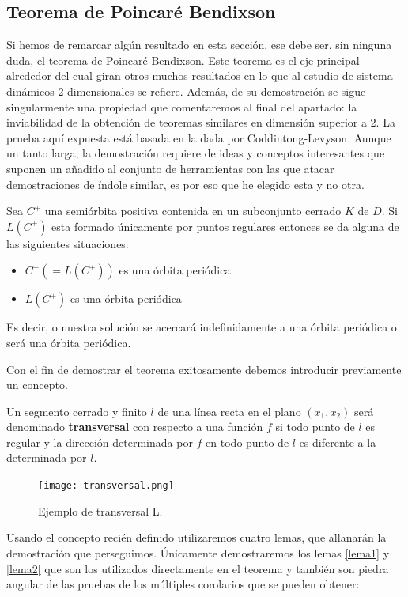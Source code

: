  \subsection{Teorema de Poincaré Bendixson}
 Si hemos de remarcar algún resultado en esta sección, ese debe ser, sin ninguna duda, el teorema de Poincaré Bendixson. Este teorema es el eje principal alrededor del cual giran otros muchos resultados en lo que al estudio de sistema dinámicos 2-dimensionales se refiere. Además, de su demostración se sigue singularmente una propiedad que comentaremos al final del apartado: la inviabilidad de la obtención de teoremas similares en dimensión superior a 2.
 La prueba aquí expuesta está basada en la dada por Coddintong-Levyson\cite{codin}. Aunque un tanto larga, la demostración requiere de ideas y conceptos interesantes que suponen un añadido al conjunto de herramientas con las que atacar demostraciones de índole similar, es por eso que he elegido esta y no otra.
 \begin{theorem}
 	\label{Poincare-Bendixson}
 	Sea $C^+$ una semiórbita positiva contenida en un subconjunto cerrado $K$ de $D$. Si $L(C^+)$ esta formado únicamente por puntos regulares entonces se da alguna de las siguientes situaciones:
 	\begin{itemize}
 		\item $C^+(=L(C^+))$ es una órbita periódica
 		\item $L(C^+)$ es una órbita periódica
 	\end{itemize}
 	Es decir, o nuestra solución se acercará indefinidamente a una órbita periódica o será una órbita periódica.
 \end{theorem}
 Con el fin de demostrar el teorema exitosamente debemos introducir previamente un concepto.\\
 \begin{defi}[Transversal]
 	Un segmento cerrado y finito $l$ de una línea recta en el plano $(x_1,x_2)$ será denominado \textbf{transversal} con respecto a una función $f$ si todo punto de $l$ es regular y la dirección determinada por $f$ en todo punto de $l$ es diferente a la determinada por $l$.
 \end{defi}
 \begin{figure}[h]
 	\centering
 	\texttt{[image: transversal.png]}
 	\caption{Ejemplo de transversal L.   }
 	\label{transversal}
 \end{figure}
 Usando el concepto recién definido utilizaremos cuatro lemas, que allanarán la demostración que perseguimos. Únicamente demostraremos los lemas \ref{lema1} y \ref{lema2} que son los utilizados directamente en el teorema y también son piedra angular de las pruebas de los múltiples corolarios que se pueden obtener:
